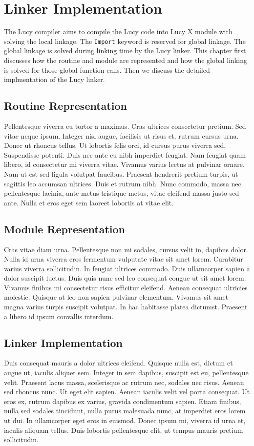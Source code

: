 \chapter{Linker Implementation}
The Lucy compiler aims to compile the Lucy code into Lucy X module with solving the local linkage. The \texttt{Import} keyword is reserved for global linkage. The global linkage is solved during linking time by the Lucy linker. This chapter first discusses how the routine and module are represented and how the global linking is solved for those global function calls. Then we discuss the detailed implmentation of the Lucy linker.

\section{Routine Representation}
Pellentesque viverra eu tortor a maximus. Cras ultrices consectetur pretium. Sed vitae neque ipsum. Integer nisl augue, facilisis ut risus et, rutrum cursus urna. Donec ut rhoncus tellus. Ut lobortis felis orci, id cursus purus viverra sed. Suspendisse potenti. Duis nec ante eu nibh imperdiet feugiat. Nam feugiat quam libero, id consectetur mi viverra vitae. Vivamus varius lectus at pulvinar ornare. Nam ut est sed ligula volutpat faucibus. Praesent hendrerit pretium turpis, ut sagittis leo accumsan ultrices. Duis et rutrum nibh. Nunc commodo, massa nec pellentesque lacinia, ante metus tristique metus, vitae eleifend massa justo sed ante. Nulla et eros eget sem laoreet lobortis at vitae elit.


\section{Module Representation}
Cras vitae diam urna. Pellentesque non mi sodales, cursus velit in, dapibus dolor. Nulla id urna viverra eros fermentum vulputate vitae sit amet lorem. Curabitur varius viverra sollicitudin. In feugiat ultrices commodo. Duis ullamcorper sapien a dolor suscipit luctus. Duis quis nunc sed leo consequat congue ut sit amet lorem. Vivamus finibus mi consectetur risus efficitur eleifend. Aenean consequat ultricies molestie. Quisque at leo non sapien pulvinar elementum. Vivamus sit amet magna varius turpis suscipit volutpat. In hac habitasse platea dictumst. Praesent a libero id ipsum convallis interdum.


\section{Linker Implementation}
Duis consequat mauris a dolor ultrices eleifend. Quisque nulla est, dictum et augue ut, iaculis aliquet sem. Integer in sem dapibus, suscipit est eu, pellentesque velit. Praesent lacus massa, scelerisque ac rutrum nec, sodales nec risus. Aenean sed rhoncus nunc. Ut eget elit sapien. Aenean iaculis velit vel porta consequat. Ut eros ex, rutrum dapibus ex varius, gravida condimentum sapien. Etiam finibus, nulla sed sodales tincidunt, nulla purus malesuada nunc, at imperdiet eros lorem ut dui. In ullamcorper eget eros in euismod. Donec ipsum mi, viverra id urna et, iaculis aliquam tellus. Duis lobortis pellentesque elit, ut tempus mauris pretium sollicitudin.

